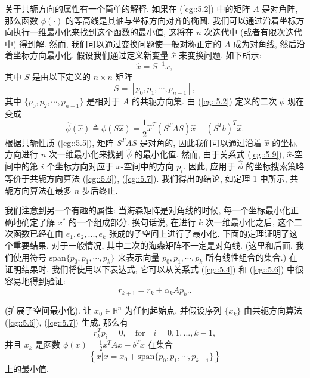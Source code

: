 \documentclass[a4paper]{ctexart}
\newcommand{\hl}[1]
{\noindent {\bf {#1}}}
\begin{document}
{关于共轭方向的属性有一个简单的解释. 如果在 (\ref{cg::5.2}) 
中的矩阵 $A$ 是对角阵, 那么函数 $\phi(\cdot)$ 的等高线是其轴与坐标方向对齐的椭圆. 
我们可以通过沿着坐标方向执行一维最小化来找到这个函数的最小值, 
这将在 $n$ 次迭代中 (或者有限次迭代中) 得到解. 
然而, 我们可以通过变换问题使一般对称正定的 $A$ 成为对角线, 
然后沿着坐标方向最小化. 假设我们通过定义新变量 $\hat{x}$ 来变换问题, 如下所示:
\begin{equation}
  \hat{x} = S^{-1}x,  \label{cg::5.9}
\end{equation}
其中 $S$ 是由以下定义的 $n \times n$ 矩阵
$$
S = [p_0, p_1, \cdots, p_{n - 1}],
$$
其中 $\{p_0, p_2, \cdots, p_{n - 1}\}$ 
是相对于 $A$ 的共轭方向集. 由 (\ref{cg::5.2}) 定义的二次 $\phi$ 现在变成
$$
\hat{\phi}(\hat{x}) \triangleq \phi(S\hat{x}) 
= \frac{1}{2}\hat{x}^T(S^T A S)\hat{x} - (S^T b)^T \hat{x}.
$$
根据共轭性质 (\ref{cg::5.5}), 矩阵 $S^T AS$ 是对角的, 
因此我们可以通过沿着 $\hat{x}$ 的坐标方向进行 $n$ 次一维最小化来找到
$\hat{\phi}$ 的最小化值. 然而, 
由于关系式 (\ref{cg::5.9}), $\hat{x}$-空间中的第 $i$ 个坐标方向对应于 
$x$-空间中的方向 $p_i$. 因此, 应用于 $\hat{\phi}$ 
的坐标搜索策略等价于共轭方向算法 (\ref{cg::5.6}), (\ref{cg::5.7}). 
我们得出的结论, 如定理 1 中所示, 共轭方向算法在最多 $n$ 步后终止.

我们注意到另一个有趣的属性: 当海森矩阵是对角线的时候, 
每一个坐标最小化正确地确定了解 $x^*$ 的一个组成部分. 
换句话说, 在进行 $k$ 次一维最小化之后, 
这个二次函数已经在由 $e_1, e_2, ..., e_k$ 张成的子空间上进行了最小化. 
下面的定理证明了这个重要结果, 对于一般情况, 其中二次的海森矩阵不一定是对角线. 
(这里和后面, 我们使用符号 $\mathrm{span}\{p_0, p_1, \cdots, p_k \}$ 
来表示向量 $p_0, p_1, \cdots, p_k$ 所有线性组合的集合.)
在证明结果时, 我们将使用以下表达式, 它可以从关系式 (\ref{cg::5.4}) 和
(\ref{cg::5.6}) 中很容易地得到验证:
\begin{equation}
  r_{k + 1} = r_{k} + \alpha_k A p_{k} . \label{cg::5.10}.
\end{equation}

\hl{定理 2} (扩展子空间最小化). 让 $x_0 \in \mathbb{R}^n$ 为任何起始点, 
并假设序列 $\{x_k\}$ 由共轭方向算法 (\ref{cg::5.6}), (\ref{cg::5.7}) 
生成. 那么有
\begin{equation}
r_k^T p_i  = 0, \quad \text{for} \quad i = 0, 1,..., k - 1, 
\label{cg::5.11}
\end{equation}
并且 $x_k$ 是函数 $\phi(x)= \frac{1}{2}x^T A x - b^T x$ 在集合
\begin{equation}
  \left\{ x | x = x_0 + \text{span}\{p_0, p_1,\cdots, p_{k - 1}\}\right\}
  \label{cg::5.12}
\end{equation}
上的最小值.

}
\end{document}
